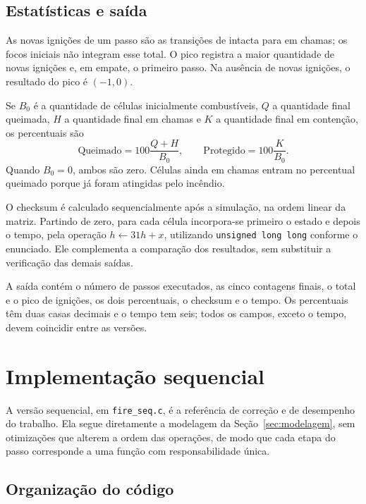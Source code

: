 \documentclass[12pt,a4paper]{article}
\begin{document}
\subsection{Estatísticas e saída}

As novas ignições de um passo são as transições de intacta para em chamas;
os focos iniciais não integram esse total. O pico registra a maior
quantidade de novas ignições e, em empate, o primeiro passo. Na ausência
de novas ignições, o resultado do pico é $(-1,0)$.

Se $B_0$ é a quantidade de células inicialmente combustíveis, $Q$ a quantidade final
queimada, $H$ a quantidade final em chamas e $K$ a quantidade final em
contenção, os percentuais são
\begin{equation}
\text{Queimado}=100\frac{Q+H}{B_0},\qquad
\text{Protegido}=100\frac{K}{B_0}.
\end{equation}
Quando $B_0=0$, ambos são zero. Células ainda em chamas entram no percentual
queimado porque já foram atingidas pelo incêndio.

O checksum é calculado sequencialmente após a simulação, na ordem linear
da matriz. Partindo de zero, para cada célula incorpora-se primeiro o estado
e depois o tempo, pela operação $h\leftarrow31h+x$, utilizando
\texttt{unsigned long long} conforme o enunciado. Ele complementa a
comparação dos resultados, sem substituir a verificação das demais saídas.

A saída contém o número de passos executados, as cinco contagens finais,
o total e o pico de ignições, os dois percentuais, o checksum e o tempo. Os percentuais têm duas
casas decimais e o tempo tem seis; todos os campos, exceto o tempo, devem
coincidir entre as versões.

\section{Implementação sequencial}

A versão sequencial, em \texttt{fire\_seq.c}, é a referência de correção e
de desempenho do trabalho. Ela segue diretamente a modelagem da
Seção~\ref{sec:modelagem}, sem otimizações que alterem a ordem das operações, de modo que
cada etapa do passo corresponde a uma função com responsabilidade única.

\subsection{Organização do código}
\end{document}
